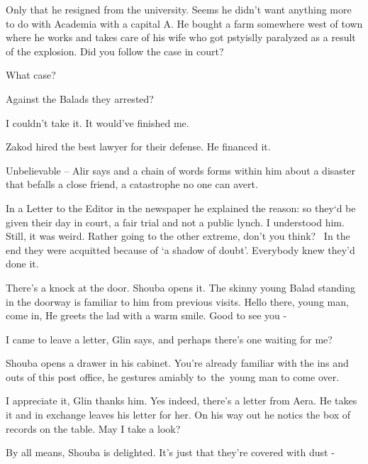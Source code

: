 \documentclass[letterpaper]{article}
\begin{document}
{\textquotedbl}Only that he resigned from the university. Seems he didn't want anything more to do with Academia with a
capital A. He bought a farm somewhere west of town where he works and takes care of his wife who got pstyislly
paralyzed as a result of the explosion. Did you follow the case in court?{\textquotedbl} 

{\textquotedbl}What case?{\textquotedbl} 

{\textquotedbl}Against the Balads they arrested?{\textquotedbl} 

{\textquotedbl}I couldn't take it. It would've finished me.{\textquotedbl} 

{\textquotedbl}Zakod hired the best lawyer for their defense. He financed it.{\textquotedbl} 

{\textquotedbl}Unbelievable --{\textquotedbl} Alir says and a chain of words forms within him about a disaster that
befalls a close friend, a catastrophe no one can avert.

{\textquotedbl}In a Letter to the Editor in the newspaper he explained the reason: so they`d be given their day in
court, a fair trial and not a public lynch. I understood him. Still, it was weird. Rather going to the other extreme,
don't you think?\textcolor[rgb]{0.0,0.6901961,0.3137255}{ \ }In the end they were acquitted because of `a shadow of
doubt'. Everybody knew they'd done it.{\textquotedbl}

There's a knock at the door. Shouba opens it. The skinny young Balad standing in the doorway is familiar to him from
previous visits. {\textquotedbl}Hello there, young man, come in,{\textquotedbl} He greets the lad with a warm smile.
{\textquotedbl}Good to see you -{\textquotedbl} 

{\textquotedbl}I came to leave a letter,{\textquotedbl} Glin says, {\textquotedbl}and perhaps there's one waiting for
me?{\textquotedbl}

Shouba opens a drawer in his cabinet. {\textquotedbl}You're already familiar with the ins and outs of this post
office,{\textquotedbl} he gestures amiably to~the~young man to come over.

{\textquotedbl}I appreciate it,{\textquotedbl} Glin thanks him. Yes indeed, there's a letter from Aera. He takes it and
in exchange leaves his letter for her. On his way out he notics the box of records on the table. {\textquotedbl}May I
take a look?{\textquotedbl} 

{\textquotedbl}By all means,{\textquotedbl} Shouba is delighted. {\textquotedbl}It's just that they're covered with dust
-{\textquotedbl} 
\end{document}
